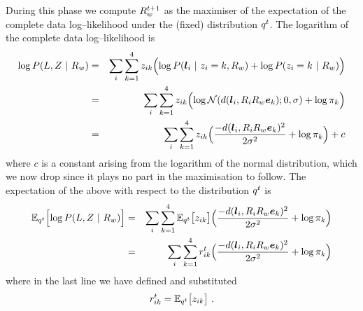 During this phase we compute $\SceneR^{t+1}$ as the maximiser of the
expectation of the complete data log--likelihood under the (fixed)
distribution $\PosteriorEst^t$. The logarithm of the complete data
log--likelihood  is
\begin{eqnarray}
  \log P(\LineSegs,\Indicators ~|~ \SceneR) 
  &=&
  \sum_i \sum_{k=1}^4 \Indicator_{ik} \Bigl(
  \log P(\LineSeg_i ~|~ \Indicator_i=k, \SceneR)
  + \log P(\Indicator_i=k ~|~ \SceneR)
  \Bigr)\\
  &=&
  \sum_i \sum_{k=1}^4 \Indicator_{ik} 
  \Bigl(
  \log \NormalDistr(\dist(\LineSeg_i, \CamR_i\SceneR\ebasis_k);0,\sigma)
  + \log \Mixing_k
  \Bigr)\\
  &=&
  \sum_i \sum_{k=1}^4 \Indicator_{ik} 
  \Bigl(
  \frac{-\dist(\LineSeg_i, \CamR_i\SceneR\ebasis_k)^2}{2\sigma^2}
  + \log \Mixing_k
  \Bigr) + c
\end{eqnarray}
where $c$ is a constant arising from the logarithm of the normal
distribution, which we now drop since it plays no part in the
maximisation to follow. The expectation of the above with respect to
the distribution $\PosteriorEst^t$ is
\begin{eqnarray}
  \Expected_{\PosteriorEst^t}\Bigl[
    \log P(\LineSegs,\Indicators ~|~ \SceneR) 
    \Bigr]
  &=&
  \sum_i \sum_{k=1}^4
  \Expected_{\PosteriorEst^t} \bigl[ \Indicator_{ik} \bigr]
  \Bigl(
  \frac{-\dist(\LineSeg_i, \CamR_i\SceneR\ebasis_k)^2}{2\sigma^2}
  + \log \Mixing_k
  \Bigr)\\
  &=&
  \label{eq:expected-lik}
  \sum_i \sum_{k=1}^4
  \Resp_{ik}^t
  \Bigl(
  \frac{-\dist(\LineSeg_i, \CamR_i\SceneR\ebasis_k)^2}{2\sigma^2}
  + \log \Mixing_k
  \Bigr)
\end{eqnarray}
where in the last line we have defined and substituted
\begin{equation}
  \Resp_{ik}^t = 
  \Expected_{\PosteriorEst^t} \bigl[ \Indicator_{ik} \bigr] ~.
\end{equation}

